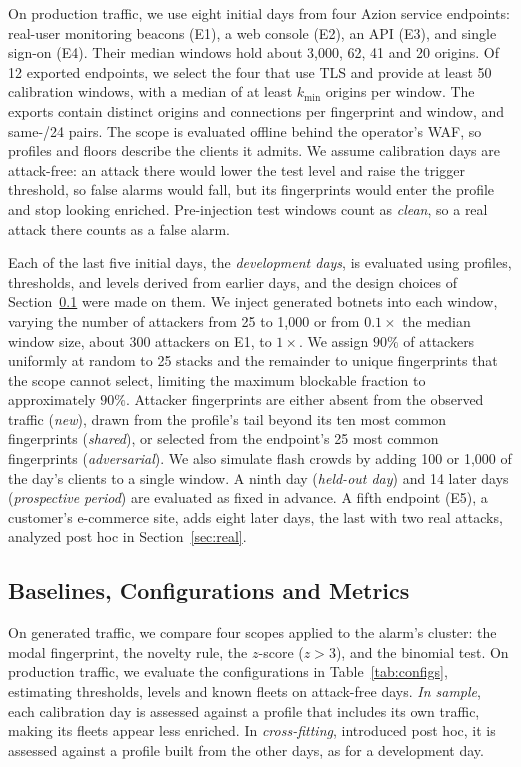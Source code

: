 \documentclass[conference,letterpaper,10pt]{IEEEtran}
\newcommand\1{\textit{(i)}}
\newcommand\2{\textit{(ii)}}
\newcommand\3{\textit{(iii)}}
\newcommand\4{\textit{(iv)}}
\newcommand\5{\textit{(v)}}
\newcommand\6{\textit{(vi)}}
\newcommand\7{\textit{(vii)}}
\newcommand\8{\textit{(viii)}}
\newcommand\9{\textit{(ix)}}
\begin{document}
On production traffic, we use eight initial days from four Azion service endpoints: real-user monitoring beacons (E1), a web console (E2), an API (E3), and single sign-on (E4). Their median windows hold about 3,000, 62, 41 and 20 origins. Of 12 exported endpoints, we select the four that use TLS and provide at least 50 calibration windows, with a median of at least $k_{\min}$ origins per window. The exports contain distinct origins and connections per fingerprint and window, and same-/24 pairs. The scope is evaluated offline behind the operator's WAF, so profiles and floors describe the clients it admits. We assume calibration days are attack-free: an attack there would lower the test level and raise the trigger threshold, so false alarms would fall, but its fingerprints would enter the profile and stop looking enriched. Pre-injection test windows count as \textit{clean}, so a real attack there counts as a false alarm.

Each of the last five initial days, the \textit{development days}, is evaluated using profiles, thresholds, and levels derived from earlier days, and the design choices of Section~\ref{sec:configs} were made on them. We inject generated botnets into each window, varying the number of attackers from 25 to 1,000 or from $0.1\times$ the median window size, about 300 attackers on E1, to $1\times$. We assign $90\%$ of attackers uniformly at random to 25 stacks and the remainder to unique fingerprints that the scope cannot select, limiting the maximum blockable fraction to approximately $90\%$. Attacker fingerprints are either absent from the observed traffic (\textit{new}), drawn from the profile's tail beyond its ten most common fingerprints (\textit{shared}), or selected from the endpoint's 25 most common fingerprints (\textit{adversarial}). We also simulate flash crowds by adding 100 or 1,000 of the day's clients to a single window. A ninth day (\textit{held-out day}) and 14 later days (\textit{prospective period}) are evaluated as fixed in advance. A fifth endpoint (E5), a customer's e-commerce site, adds eight later days, the last with two real attacks, analyzed post hoc in Section~\ref{sec:real}.

\subsection{Baselines, Configurations and Metrics}
\label{sec:configs}

On generated traffic, we compare four scopes applied to the alarm's cluster: the modal fingerprint, the novelty rule, the $z$-score ($z>3$), and the binomial test. On production traffic, we evaluate the configurations in Table~\ref{tab:configs}, estimating thresholds, levels and known fleets on attack-free days. \textit{In sample}, each calibration day is assessed against a profile that includes its own traffic, making its fleets appear less enriched. In \textit{cross-fitting}, introduced post hoc, it is assessed against a profile built from the other days, as for a development day.
\end{document}

